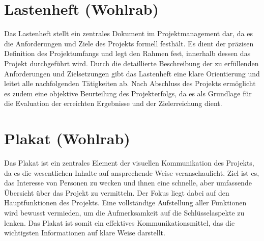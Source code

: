 \section{Lastenheft (Wohlrab)}

Das Lastenheft stellt ein zentrales Dokument im Projektmanagement dar, da es die Anforderungen und Ziele des Projekts formell festhält. 
Es dient der präzisen Definition des Projektumfangs und legt den Rahmen fest, innerhalb dessen das Projekt durchgeführt wird. 
Durch die detaillierte Beschreibung der zu erfüllenden Anforderungen und Zielsetzungen gibt das Lastenheft eine klare Orientierung und leitet alle nachfolgenden Tätigkeiten ab. 
Nach Abschluss des Projekts ermöglicht es zudem eine objektive Beurteilung des Projekterfolgs, da es als Grundlage für die Evaluation der erreichten Ergebnisse und der Zielerreichung dient.

\section{Plakat (Wohlrab)}

Das Plakat ist ein zentrales Element der visuellen Kommunikation des Projekts, da es die wesentlichen Inhalte auf ansprechende Weise veranschaulicht. 
Ziel ist es, das Interesse von Personen zu wecken und ihnen eine schnelle, aber umfassende Übersicht über das Projekt zu vermitteln. 
Der Fokus liegt dabei auf den Hauptfunktionen des Projekts. 
Eine vollständige Aufstellung aller Funktionen wird bewusst vermieden, um die Aufmerksamkeit auf die Schlüsselaspekte zu lenken. 
Das Plakat ist somit ein effektives Kommunikationsmittel, das die wichtigsten Informationen auf klare Weise darstellt.
